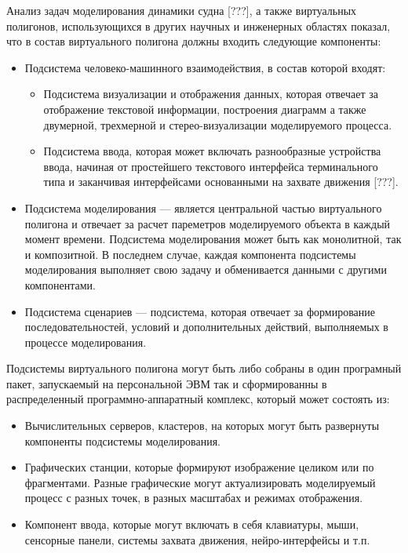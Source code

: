 Анализ задач моделирования динамики судна [???], а также виртуальных полигонов, использующихся в других научных и инженерных областях показал, что в состав виртуального полигона должны входить следующие компоненты:
\begin{itemize}
\item   Подсистема человеко-машинного взаимодействия, в состав которой входят:
	\begin{itemize}
	\item Подсистема визуализации и отображения данных, которая отвечает за отображение текстовой информации, построения диаграмм а также двумерной, трехмерной и стерео-визуализации моделируемого процесса.
	\item Подсистема ввода, которая может включать разнообразные устройства ввода, начиная от простейшего текстового интерфейса терминального типа и заканчивая интерфейсами основанными на захвате движения [???].
	\end{itemize}
\item	Подсистема моделирования --- является центральной частью виртуального полигона и отвечает за расчет пареметров моделируемого объекта в каждый момент времени. Подсистема моделирования может быть как монолитной, так и композитной. В последнем случае, каждая компонента подсистемы моделирования выполняет свою задачу и обменивается данными с другими компонентами.
\item	Подсистема сценариев --- подсистема, которая отвечает за формирование последовательностей, условий и дополнительных действий, выполняемых в процессе моделирования.
\end{itemize}

Подсистемы виртуального полигона могут быть либо собраны в один програмный пакет, запускаемый на персональной ЭВМ так и сформированны в распределенный программно-аппаратный комплекс, который может состоять из:
\begin{itemize}
\item Вычислительных серверов, кластеров, на которых могут быть развернуты компоненты подсистемы моделирования.
\item Графических станции, которые формируют изображение целиком или по фрагментами. Разные графические могут актуализировать моделируемый процесс с разных точек, в разных масштабах и режимах отображения.
\item Компонент ввода, которые могут включать в себя клавиатуры, мыши, сенсорные панели, системы захвата движения, нейро-интерфейсы и т.п.
\end{itemize}





